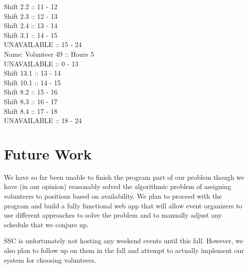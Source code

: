 \documentclass[12pt]{article}
\theoremstyle{definition}
\begin{document}
\begin{multicols}{2}
        Shift 2.2 :: 11 - 12\\
        Shift 2.3 :: 12 - 13\\
        Shift 2.4 :: 13 - 14\\
        Shift 3.1 :: 14 - 15\\
        UNAVAILABLE :: 15 - 24\\
Name: Volunteer 49 :: Hours 5\\
        UNAVAILABLE :: 0 - 13\\
        Shift 13.1 :: 13 - 14\\
        Shift 10.1 :: 14 - 15\\
        Shift 8.2 :: 15 - 16\\
        Shift 8.3 :: 16 - 17\\
        Shift 8.4 :: 17 - 18\\
        UNAVAILABLE :: 18 - 24


\section{Future Work}
We have so far been unable to finish the program part of our problem though we have (in our opinion) reasonably solved the algorithmic problem of assigning volunteers to positions based on availability.
We plan to proceed with the program and build a fully functional web app that will allow event organizers to use different approaches to solve the problem and to manually adjust any schedule that we conjure up.

SSC is unfortunately not hosting any weekend events until this fall.
However, we also plan to follow up on them in the fall and attempt to actually implement our system for choosing volunteers.

\end{multicols}
\end{document}
